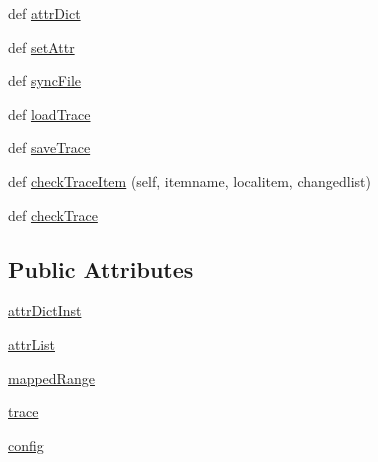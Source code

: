 \begin{DoxyCompactItemize}
\item 
def \hyperlink{classsoftware_1_1chipwhisperer_1_1common_1_1traces_1_1__cfgfile_1_1TraceContainerConfig_ae233030bf89194535f55800fe2dd8f05}{attr\+Dict}
\item 
def \hyperlink{classsoftware_1_1chipwhisperer_1_1common_1_1traces_1_1__cfgfile_1_1TraceContainerConfig_a964b903ee7824416df2f32cf00b77644}{set\+Attr}
\item 
def \hyperlink{classsoftware_1_1chipwhisperer_1_1common_1_1traces_1_1__cfgfile_1_1TraceContainerConfig_a4a724a27d4491869088867b22a18d44a}{sync\+File}
\item 
def \hyperlink{classsoftware_1_1chipwhisperer_1_1common_1_1traces_1_1__cfgfile_1_1TraceContainerConfig_a13953a9da71b1f9e3f284536a525f890}{load\+Trace}
\item 
def \hyperlink{classsoftware_1_1chipwhisperer_1_1common_1_1traces_1_1__cfgfile_1_1TraceContainerConfig_add441a867daedf7eb7deeef41d929a5c}{save\+Trace}
\item 
def \hyperlink{classsoftware_1_1chipwhisperer_1_1common_1_1traces_1_1__cfgfile_1_1TraceContainerConfig_a6a8a4b76fb08dbe7303d7ba379fabd1a}{check\+Trace\+Item} (self, itemname, localitem, changedlist)
\item 
def \hyperlink{classsoftware_1_1chipwhisperer_1_1common_1_1traces_1_1__cfgfile_1_1TraceContainerConfig_ad0b2c84e52dd7f1fc2d94e9a983e2fad}{check\+Trace}
\end{DoxyCompactItemize}
\subsection*{Public Attributes}
\begin{DoxyCompactItemize}
\item 
\hyperlink{classsoftware_1_1chipwhisperer_1_1common_1_1traces_1_1__cfgfile_1_1TraceContainerConfig_a077f17e52165a436ad5390b2fe244ecd}{attr\+Dict\+Inst}
\item 
\hyperlink{classsoftware_1_1chipwhisperer_1_1common_1_1traces_1_1__cfgfile_1_1TraceContainerConfig_a50e6444b02d5847a6afbb976b45a200b}{attr\+List}
\item 
\hyperlink{classsoftware_1_1chipwhisperer_1_1common_1_1traces_1_1__cfgfile_1_1TraceContainerConfig_af2768fe77299d03ee0bb4f703254f593}{mapped\+Range}
\item 
\hyperlink{classsoftware_1_1chipwhisperer_1_1common_1_1traces_1_1__cfgfile_1_1TraceContainerConfig_aa72086d18253a4c676edfc39e11ca2ef}{trace}
\item 
\hyperlink{classsoftware_1_1chipwhisperer_1_1common_1_1traces_1_1__cfgfile_1_1TraceContainerConfig_ac56f6f65211948add4b2fa9192e44f41}{config}
\end{DoxyCompactItemize}


